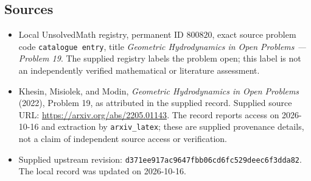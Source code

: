 \documentclass[11pt]{article}
\begin{document}
\subsection{Sources}
\begin{itemize}
\item Local UnsolvedMath registry, permanent ID \(800820\), exact source problem code \texttt{catalogue entry}, title \emph{Geometric Hydrodynamics in Open Problems --- Problem 19}. The supplied registry labels the problem open; this label is not an independently verified mathematical or literature assessment.
\item Khesin, Misiolek, and Modin, \emph{Geometric Hydrodynamics in Open Problems} (2022), Problem 19, as attributed in the supplied record. Supplied source URL: \url{https://arxiv.org/abs/2205.01143}. The record reports access on 2026-10-16 and extraction by \texttt{arxiv\_latex}; these are supplied provenance details, not a claim of independent source access or verification.
\item Supplied upstream revision: \texttt{d371ee917ac9647fbb06cd6fc529deec6f3dda82}. The local record was updated on 2026-10-16.
\end{itemize}
\end{document}
